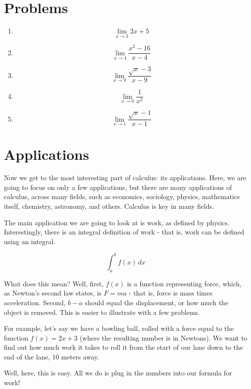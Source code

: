 \documentclass[12pt]{article}
\begin{document}
\section{Problems}
\begin{enumerate}
    \item $$\lim\limits_{x\rightarrow 3} 2x+5$$
    \item $$\lim\limits_{x\rightarrow 4} \frac{x^2-16}{x-4}$$
    \item $$\lim\limits_{x\rightarrow 9} \frac{\sqrt{x}-3}{x-9}$$
    \item $$\lim\limits_{x\rightarrow 0} \frac{1}{x^2}$$
    \item $$\lim\limits_{x\rightarrow 1} \frac{\sqrt{x}-1}{x-1}$$
\end{enumerate}

\section{Applications}

Now we get to the most interesting part of calculus: its applications. 
Here, we are going to focus on only a few applications, but there are many applications of calculus, across many fields, such as economics, sociology, physics, mathematics itself, chemistry, astronomy, and others. 
Calculus is key in many fields.

The main application we are going to look at is work, as defined by physics. 
Interestingly, there is an integral definition of work - that is, work can be defined using an integral.

\begin{equation*}
    \int^b_a f(x) \, dx
\end{equation*}

What does this mean? 
Well, first, $f(x)$ is a function representing force, which, as Newton's second law states, is $F = ma$ - that is, force is mass times acceleration. 
Second, $b - a$ should equal the displacement, or how much the object is removed. 
This is easier to illustrate with a few problems.

For example, let's say we have a bowling ball, rolled with a force equal to the function $f(x) = 2x+3$ (where the resulting number is in Newtons). 
We want to find out how much work it takes to roll it from the start of our lane down to the end of the lane, 10 meters away.

Well, here, this is easy. All we do is plug in the numbers into our formula for work! 
\end{document}
